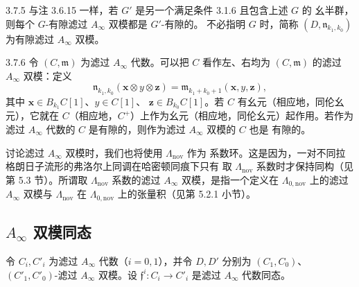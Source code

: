 \begin{definition}{3.7.5}
与注 3.6.15 一样，若 $G'$ 是另一个满足条件 3.1.6 且包含上述 $G$ 的
幺半群，则每个 $G$-有隙滤过 $A_\infty$ 双模都是 $G'$-有隙的。
不必指明 $G$ 时，简称 $(D,\mathfrak n_{k_1,k_0})$ 为有隙滤过
$A_\infty$ 双模。
\end{definition}

\begin{example}{3.7.6}\label{ex:3-7-6}
令 $(C,\mathfrak m)$ 为滤过 $A_\infty$ 代数。可以把 $C$ 看作左、右均为
$(C,\mathfrak m)$ 的滤过 $A_\infty$ 双模：定义
\[
  \mathfrak n_{k_1,k_0}(\mathbf x\otimes y\otimes\mathbf z)
  =\mathfrak m_{k_1+k_0+1}(\mathbf x,y,\mathbf z),
\]
其中 $\mathbf x\in B_{k_1}C[1]$、$y\in C[1]$、
$\mathbf z\in B_{k_0}C[1]$。若 $C$ 有幺元（相应地，同伦幺元），它就在
$C$（相应地，$C^+$）上作为幺元（相应地，同伦幺元）起作用。若作为滤过
$A_\infty$ 代数的 $C$ 是有隙的，则作为滤过 $A_\infty$ 双模的 $C$ 也是
有隙的。
\end{example}

讨论滤过 $A_\infty$ 双模时，我们也将使用 $\Lambda_{\mathrm{nov}}$ 作为
系数环。这是因为，一对不同拉格朗日子流形的弗洛尔上同调在哈密顿同痕下只有
取 $\Lambda_{\mathrm{nov}}$ 系数时才保持同构（见第 5.3 节）。所谓取
$\Lambda_{\mathrm{nov}}$ 系数的滤过 $A_\infty$ 双模，是指一个定义在
$\Lambda_{0,\mathrm{nov}}$ 上的滤过 $A_\infty$ 双模与
$\Lambda_{\mathrm{nov}}$ 在 $\Lambda_{0,\mathrm{nov}}$ 上的张量积（见第
5.2.1 小节）。

\subsection{$A_\infty$ 双模同态}
\label{subsec:3-7-2}

令 $C_i,C'_i$ 为滤过 $A_\infty$ 代数（$i=0,1$），并令 $D,D'$ 分别为
$(C_1,C_0)$、$(C'_1,C'_0)$-滤过 $A_\infty$ 双模。设
$\mathfrak f^i\colon C_i\to C'_i$ 是滤过 $A_\infty$ 代数同态。

